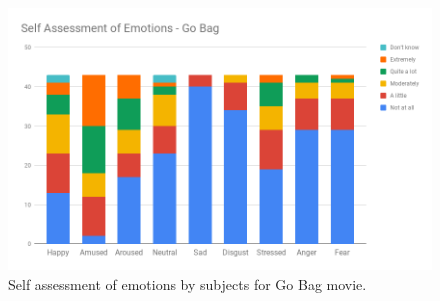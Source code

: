 \begin{figure}
\centering
\includegraphics[width=140mm]{Figures/go_bag.png}
\caption{Self assessment of emotions by subjects for Go Bag movie.}
\label{fig:go_bag}
\end{figure}